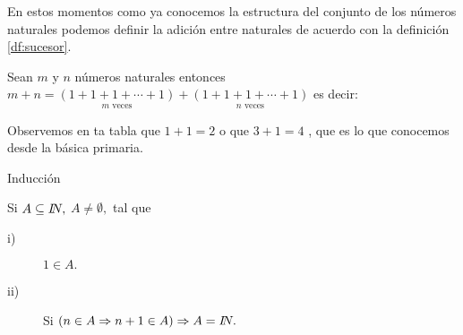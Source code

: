 En estos momentos como ya conocemos la estructura del conjunto de
los números naturales podemos definir la adición entre naturales de
acuerdo con la definición \ref{df:sucesor}.

Sean $m$ y $n$ números naturales entonces $m+n=\underset{m\mbox{ veces}}{(1+1+1+\cdots+1)}+\underset{n\mbox{ veces}}{\left(1+1+1+\cdots+1\right)}$
es decir:

\begin{table}[H]
\centering

\caption{Tabla de la adición entre números naturales.}
\label{tun}
\end{table}
Observemos en ta tabla que $1+1=2$ o que $3+1=4$ , que es lo que
conocemos desde la básica primaria.\medskip{}
\medskip{}

\begin{axioma}{ Inducción \label{induccion}}

Si $A\subseteq\na,$ $A\neq\emptyset,$ tal que 
\begin{description}
\item [{i)}] $1\in A.$
\item [{ii)}] Si $\left(n\in A\Rightarrow n+1\in A\right)\Rightarrow A=\na.$
\end{description}
\end{axioma}


